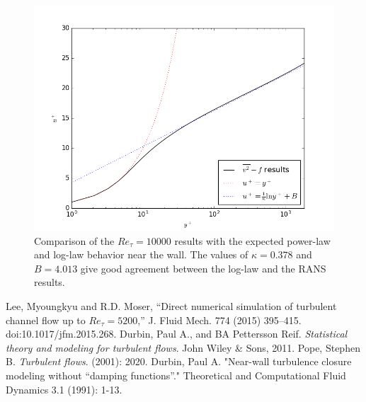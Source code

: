 \documentclass[a4paper,11pt]{article}
\begin{document}
\begin{figure}
 \centering
 \includegraphics[width=\textwidth]{loglaw_5200}
 \caption{Comparison of the $Re_{\tau} = 10000$ results with the expected power-law and log-law behavior near the wall. The values of $\kappa = 0.378$ and $B = 4.013$ give good agreement between the log-law and the RANS results.}
 \label{fig:loglaw10000}
\end{figure}


\clearpage
\begin{thebibliography}{3}
Lee, Myoungkyu and R.D. Moser, ``Direct numerical simulation of turbulent channel flow up to $Re_{\tau}=5200$,'' J. Fluid Mech. 774 (2015) 395–415. doi:10.1017/jfm.2015.268.
    Durbin, Paul A., and BA Pettersson Reif. \textit{Statistical theory and
modeling for turbulent flows}. John Wiley \& Sons, 2011.
        Pope, Stephen B. \textit{Turbulent flows}. (2001): 2020.
        Durbin, Paul A. "Near-wall turbulence closure modeling without “damping
functions”." Theoretical and Computational Fluid Dynamics 3.1 (1991): 1-13.
 
\newpage



\end{thebibliography}
\end{document}
